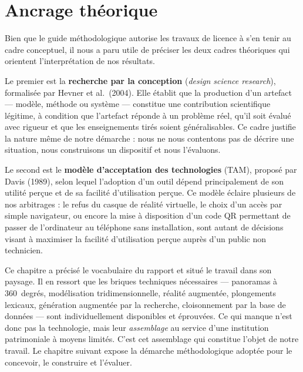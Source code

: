 \section{Ancrage théorique}
\label{sec:theorique}

Bien que le guide méthodologique autorise les travaux de licence à s'en tenir au
cadre conceptuel, il nous a paru utile de préciser les deux cadres théoriques
qui orientent l'interprétation de nos résultats.

Le premier est la \textbf{recherche par la conception} (\emph{design science
research}), formalisée par Hevner et al.\ (2004). Elle établit que la production
d'un artefact — modèle, méthode ou système — constitue une contribution
scientifique légitime, à condition que l'artefact réponde à un problème réel,
qu'il soit évalué avec rigueur et que les enseignements tirés soient
généralisables. Ce cadre justifie la nature même de notre démarche : nous ne
nous contentons pas de décrire une situation, nous construisons un dispositif et
nous l'évaluons.

Le second est le \textbf{modèle d'acceptation des technologies} (TAM), proposé
par Davis (1989), selon lequel l'adoption d'un outil dépend principalement de
son utilité perçue et de sa facilité d'utilisation perçue. Ce modèle éclaire
plusieurs de nos arbitrages : le refus du casque de réalité virtuelle, le choix
d'un accès par simple navigateur, ou encore la mise à disposition d'un code QR
permettant de passer de l'ordinateur au téléphone sans installation, sont autant
de décisions visant à maximiser la facilité d'utilisation perçue auprès d'un
public non technicien.

\conclchap

Ce chapitre a précisé le vocabulaire du rapport et situé le travail dans son
paysage. Il en ressort que les briques techniques nécessaires — panoramas à
360~degrés, modélisation tridimensionnelle, réalité augmentée, plongements
lexicaux, génération augmentée par la recherche, cloisonnement par la base de
données — sont individuellement disponibles et éprouvées. Ce qui manque n'est
donc pas la technologie, mais leur \emph{assemblage} au service d'une
institution patrimoniale à moyens limités. C'est cet assemblage qui constitue
l'objet de notre travail. Le chapitre suivant expose la démarche méthodologique
adoptée pour le concevoir, le construire et l'évaluer.
